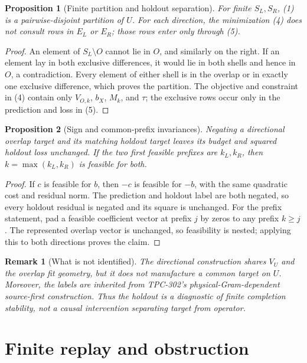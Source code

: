 \documentclass[11pt]{article}
\newtheorem{proposition}{Proposition}
\newtheorem{remark}{Remark}
\begin{document}
\begin{proposition}[Finite partition and holdout separation]
For finite $S_L,S_R$, (1) is a pairwise-disjoint partition of $U$.  For each
direction, the minimization (4) does not consult rows in $E_L$ or $E_R$;
those rows enter only through (5).
\end{proposition}
\begin{proof}
An element of $S_L\setminus O$ cannot lie in $O$, and similarly on the right.
If an element lay in both exclusive differences, it would lie in both shells
and hence in $O$, a contradiction.  Every element of either shell is in the
overlap or in exactly one exclusive difference, which proves the partition.
The objective and constraint in (4) contain only $V_{O,k}$, $b_X$, $M_k$,
and $\tau$; the exclusive rows occur only in the prediction and loss in (5).
\end{proof}

\begin{proposition}[Sign and common-prefix invariances]
Negating a directional overlap target and its matching holdout target leaves
its budget and squared holdout loss unchanged.  If the two first feasible
prefixes are $k_L,k_R$, then $k=\max(k_L,k_R)$ is feasible for both.
\end{proposition}
\begin{proof}
If $c$ is feasible for $b$, then $-c$ is feasible for $-b$, with the same
quadratic cost and residual norm.  The prediction and holdout label are both
negated, so every holdout residual is negated and its square is unchanged.
For the prefix statement, pad a feasible coefficient vector at prefix $j$ by
zeros to any prefix $k\geq j$.  The represented overlap vector is unchanged,
so feasibility is nested; applying this to both directions proves the claim.
\end{proof}

\begin{remark}[What is not identified]
The directional construction shares $V_U$ and the overlap fit geometry, but it
does not manufacture a common target on $U$.  Moreover, the labels are
inherited from TPC-302's physical-Gram-dependent source-first construction.
Thus the holdout is a diagnostic of finite completion stability, not a causal
intervention separating target from operator.
\end{remark}

\section{Finite replay and obstruction}
\end{document}

